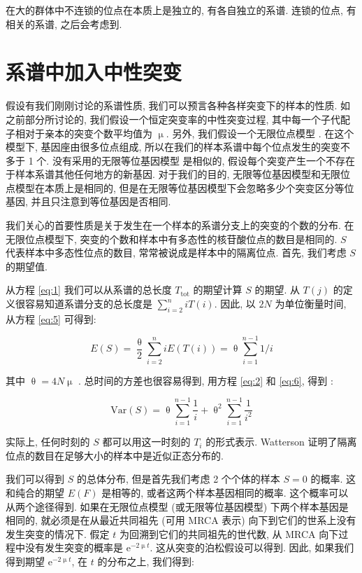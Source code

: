 \documentclass[12pt]{article}
\begin{document}
在大的群体中不连锁的位点在本质上是独立的, 有各自独立的系谱. 连锁的位点, 有相关的系谱, 之后会考虑到.

\section{系谱中加入中性突变}

假设有我们刚刚讨论的系谱性质, 我们可以预言各种各样突变下的样本的性质. 如之前部分所讨论的,
我们假设一个恒定突变率的中性突变过程, 其中每一个子代配子相对于亲本的突变个数平均值为 $\upmu$. 另外,
我们假设一个无限位点模型 \parencite{kimura1969}. 在这个模型下, 基因座由很多位点组成,
所以在我们的样本系谱中每个位点发生的突变不多于 1 个. 没有采用的无限等位基因模型 \parencite{kimura1964} 是相似的,
假设每个突变产生一个不存在于样本系谱其他任何地方的新基因. 对于我们的目的, 无限等位基因模型和无限位点模型在本质上是相同的,
但是在无限等位基因模型下会忽略多少个突变区分等位基因, 并且只注意到等位基因是否相同.

我们关心的首要性质是关于发生在一个样本的系谱分支上的突变的个数的分布.
在无限位点模型下, 突变的个数和样本中有多态性的核苷酸位点的数目是相同的.
$S$ 代表样本中多态性位点的数目, 常常被说成是样本中的隔离位点.
首先, 我们考虑 $S$ 的期望值.

从方程 \ref{eq:1} 我们可以从系谱的总长度 $T_{\text{tot}}$ 的期望计算 $S$ 的期望. 从 $T(j)$
的定义很容易知道系谱分支的总长度是 $\sum_{i=2}^{n} i T(i)$. 因此, 以 $2N$ 为单位衡量时间, 从方程
\ref{eq:5} 可得到:

\begin{equation} \label{eq:6}
    E(S)=\frac{\uptheta}{2} \sum_{i=2}^{n} iE(T(i)) = \uptheta \sum_{i=1}^{n-1}1/i
\end{equation}

其中 $\uptheta = 4N \upmu$ \parencite{watterson1975}. 总时间的方差也很容易得到,
用方程 \ref{eq:2} 和 \ref{eq:6}, 得到 \parencite{watterson1975}:

\begin{equation} \label{eq:7}
    \text{Var}(S) = \uptheta \sum_{i=1}^{n-1} \frac{1}{i} + \uptheta^{2} \sum_{i=1}^{n-1} \frac{1}{i^{2}}
\end{equation}

实际上, 任何时刻的 $S$ 都可以用这一时刻的 $T_{i}$ 的形式表示.
Watterson 证明了隔离位点的数目在足够大小的样本中是近似正态分布的.

我们可以得到 $S$ 的总体分布, 但是首先我们考虑 2 个个体的样本 $S=0$ 的概率. 这和纯合的期望 $E(F)$ 是相等的,
或者这两个样本基因相同的概率. 这个概率可以从两个途径得到. 如果在无限位点模型 (或无限等位基因模型) 下两个样本基因是相同的,
就必须是在从最近共同祖先 (可用 MRCA 表示) 向下到它们的世系上没有发生突变的情况下. 假定 $t$
为回溯到它们的共同祖先的世代数, 从 MRCA 向下过程中没有发生突变的概率是 $\mathrm{e}^{-2\upmu t}$.
这从突变的泊松假设可以得到. 因此, 如果我们得到期望 $\mathrm{e}^{-2\upmu t}$, 在 $t$ 的分布之上, 我们得到:
\end{document}
